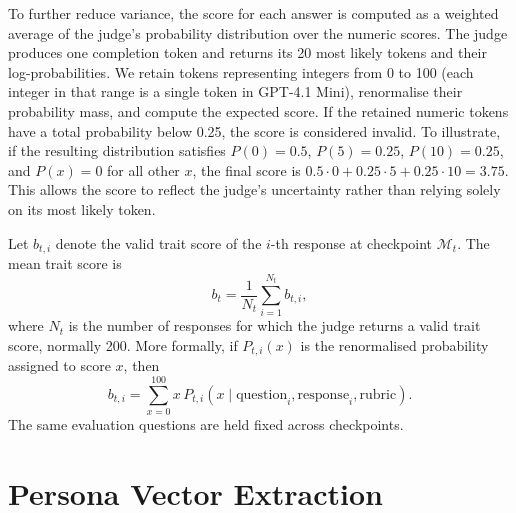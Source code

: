 To further reduce variance, the score for each answer is computed as a weighted average of the judge's probability distribution over the numeric scores. The judge produces one completion token and returns its 20 most likely tokens and their log-probabilities. We retain tokens representing integers from 0 to 100 (each integer in that range is a single token in GPT-4.1 Mini), renormalise their probability mass, and compute the expected score. If the retained numeric tokens have a total probability below 0.25, the score is considered invalid. To illustrate, if the resulting distribution satisfies $P(0)=0.5$, $P(5)=0.25$, $P(10)=0.25$, and $P(x)=0$ for all other $x$, the final score is $0.5\cdot0+0.25\cdot5+0.25\cdot10=3.75$. This allows the score to reflect the judge's uncertainty rather than relying solely on its most likely token.

Let $b_{t,i}$ denote the valid trait score of the $i$-th response at checkpoint $\mathcal{M}_t$. The mean trait score is
\begin{equation}
b_t = \frac{1}{N_t}\sum_{i=1}^{N_t} b_{t,i},
\label{eq:behaviour-score}
\end{equation}
where $N_t$ is the number of responses for which the judge returns a valid trait score, normally 200. More formally, if $P_{t,i}(x)$ is the renormalised probability assigned to score $x$, then
\begin{equation}
b_{t,i}
=
\sum_{x=0}^{100}x\,P_{t,i}\!\left(x\mid
\text{question}_i,\text{response}_i,\text{rubric}\right).
\label{eq:judge-expectation}
\end{equation}
The same evaluation questions are held fixed across checkpoints.


\section{Persona Vector Extraction}
\label{sec:personavec}

